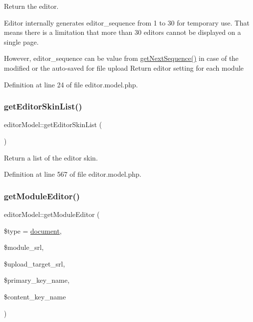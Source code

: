 Return the editor. 

Editor internally generates editor\+\_\+sequence from 1 to 30 for temporary use. That means there is a limitation that more than 30 editors cannot be displayed on a single page.

However, editor\+\_\+sequence can be value from \hyperlink{func_8inc_8php_a5a97b458f9c5b4fe3574671840aee27c}{get\+Next\+Sequence()} in case of the modified or the auto-\/saved for file upload Return editor setting for each module 

Definition at line 24 of file editor.\+model.\+php.

\hypertarget{classeditorModel_ae67ee69d58776938a04d14d0df5284ff}{}\label{classeditorModel_ae67ee69d58776938a04d14d0df5284ff} 
\subsubsection{\texorpdfstring{get\+Editor\+Skin\+List()}{getEditorSkinList()}}
{\footnotesize\ttfamily editor\+Model\+::get\+Editor\+Skin\+List (\begin{DoxyParamCaption}{ }\end{DoxyParamCaption})}



Return a list of the editor skin. 



Definition at line 567 of file editor.\+model.\+php.

\hypertarget{classeditorModel_af2b57078eb05b65c0094d5dac0186ca5}{}\label{classeditorModel_af2b57078eb05b65c0094d5dac0186ca5} 
\subsubsection{\texorpdfstring{get\+Module\+Editor()}{getModuleEditor()}}
{\footnotesize\ttfamily editor\+Model\+::get\+Module\+Editor (\begin{DoxyParamCaption}\item[{}]{\$type = {\ttfamily \textquotesingle{}\hyperlink{classdocument}{document}\textquotesingle{}},  }\item[{}]{\$module\+\_\+srl,  }\item[{}]{\$upload\+\_\+target\+\_\+srl,  }\item[{}]{\$primary\+\_\+key\+\_\+name,  }\item[{}]{\$content\+\_\+key\+\_\+name }\end{DoxyParamCaption})}



